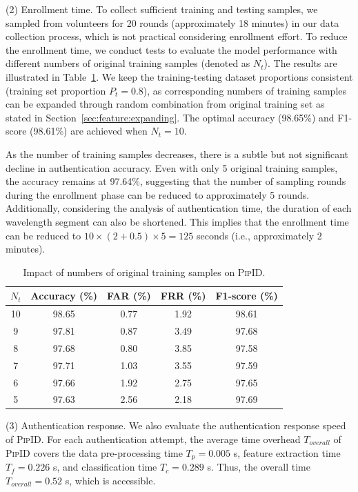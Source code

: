 \documentclass[sigconf]{acmart}
\newcommand{\sysname}{\textsc{PipID}\xspace}
\begin{document}
(2) Enrollment time.
\label{sec:impact of testing set proportion}
To collect sufficient training and testing samples, we sampled from volunteers for 20 rounds (approximately 18 minutes) in our data collection process, which is not practical considering enrollment effort. To reduce the enrollment time, we conduct tests to evaluate the model performance with different numbers of original training samples (denoted as $N_t$). The results are illustrated in Table~\ref{tab: testing set proportion}. We keep the training-testing dataset proportions consistent (training set proportion $P_t = 0.8$), as corresponding numbers of training samples can be expanded through random combination from original training set as stated in Section~\ref{sec:feature:expanding}. The optimal accuracy (98.65\%) and F1-score (98.61\%) are achieved when $N_t = 10$. 

As the number of training samples decreases, there is a subtle but not significant decline in authentication accuracy. Even with only 5 original training samples, the accuracy remains at 97.64\%, suggesting that the number of sampling rounds during the enrollment phase can be reduced to approximately 5 rounds. Additionally, considering the analysis of authentication time, the duration of each wavelength segment can also be shortened. This implies that the enrollment time can be reduced to $10 \times (2+0.5) \times 5 = 125$ seconds (i.e., approximately 2 minutes).
\begin{table}[t]
\centering
\caption{Impact of numbers of original training samples on \sysname.}
\vspace{-2mm}
\label{tab: testing set proportion}
\begin{tabular}{ccccc}
\toprule
\textbf{$N_{t}$} & \textbf{Accuracy (\%)} & \textbf{FAR (\%)} & \textbf{FRR (\%)} & \textbf{F1-score (\%)} \\
\midrule
10 & 98.65 & 0.77 & 1.92 & 98.61 \\
9 & 97.81 & 0.87 & 3.49 & 97.68 \\
8 & 97.68 & 0.80 & 3.85 & 97.58 \\
7 & 97.71 & 1.03 & 3.55 & 97.59 \\
6 & 97.66 & 1.92 & 2.75 & 97.65 \\
5 & 97.63 & 2.56 & 2.18 & 97.69 \\
\bottomrule
\end{tabular}
\vspace{-2mm}
\end{table}


(3) Authentication response.
We also evaluate the authentication response speed of \sysname. For each authentication attempt, the average time overhead $T_{overall}$ of \sysname covers the data pre-processing time $T_p = 0.005$ s, feature extraction time $T_f = 0.226$ s, and classification time $T_c = 0.289$ s. Thus, the overall time $T_{overall} = 0.52$ s, which is accessible. 
\end{document}
